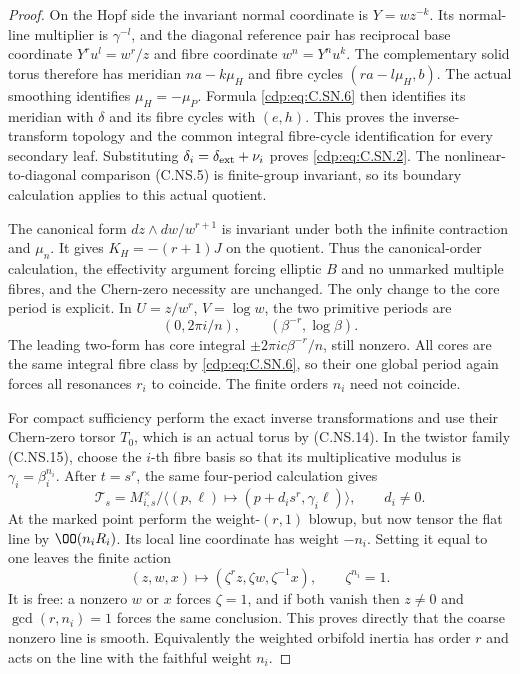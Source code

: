 \begin{proof}
On the Hopf side the invariant normal coordinate
is $Y=wz^{-k}$. Its normal-line multiplier is $\gamma^{-l}$,
and the diagonal reference pair has reciprocal
base coordinate $Y^ru^l=w^r/z$ and fibre coordinate
$w^n=Y^nu^k$. The complementary solid torus
therefore has meridian $n a-k\mu_H$ and fibre
cycles $(r a-l\mu_H,b)$. The actual smoothing
identifies $\mu_H=-\mu_P$. Formula \eqref{cdp:eq:C.SN.6}
then identifies its meridian with $\delta$
and its fibre cycles with $(e,h)$. This proves
the inverse-transform topology and the common
integral fibre-cycle identification for every
secondary leaf. Substituting
$\delta_i=\delta_{\rm ext}+\nu_i$ proves \eqref{cdp:eq:C.SN.2}.
The nonlinear-to-diagonal comparison (C.NS.5)
is finite-group invariant, so its boundary
calculation applies to this actual quotient.

The canonical form
$dz\wedge dw/w^{r+1}$ is invariant under both
the infinite contraction and $\mu_n$. It gives
$K_H=-(r+1)J$ on the quotient. Thus the
canonical-order calculation, the effectivity
argument forcing elliptic $B$ and no unmarked
multiple fibres, and the Chern-zero necessity
are unchanged. The only change to the core
period is explicit. In $U=z/w^r$, $V=\log w$,
the two primitive periods are
\[
             (0,2\pi i/n),\qquad
             (\beta^{-r},\log\beta).
                                                        \tag{C.SN.7}\label{cdp:eq:C.SN.7}
\]
The leading two-form has core integral
$\pm2\pi i c\beta^{-r}/n$, still nonzero.
All cores are the same integral fibre class
by \eqref{cdp:eq:C.SN.6}, so their one global period
again forces all resonances $r_i$ to coincide.
The finite orders $n_i$ need not coincide.

For compact sufficiency perform the exact
inverse transformations and use their
Chern-zero torsor $T_0$, which is an actual
torus by (C.NS.14). In the twistor family
(C.NS.15), choose the $i$-th fibre basis
so that its multiplicative modulus is
$\gamma_i=\beta_i^{n_i}$. After $t=s^r$,
the same four-period calculation gives
\[
 \mathcal T_s=M_{i,s}^{\times}/
   \langle(p,\ell)\mapsto
        (p+d_i s^r,\gamma_i\ell)\rangle,\qquad d_i\ne0.
                                                        \tag{C.SN.8}\label{cdp:eq:C.SN.8}
\]
At the marked point perform the weight-$(r,1)$
blowup, but now tensor the flat line by
$\OO(n_iR_i)$. Its local line coordinate
has weight $-n_i$. Setting it equal to one
leaves the finite action
\[
 (z,w,x)\mapsto
      (\zeta^{r}z,\zeta w,\zeta^{-1}x),
                    \qquad \zeta^{n_i}=1.                \tag{C.SN.9}\label{cdp:eq:C.SN.9}
\]
It is free: a nonzero $w$ or $x$ forces
$\zeta=1$, and if both vanish then $z\ne0$
and $\gcd(r,n_i)=1$ forces the same conclusion.
This proves directly that the coarse nonzero
line is smooth. Equivalently the weighted
orbifold inertia has order $r$ and acts
on the line with the faithful weight $n_i$.


\end{proof}
